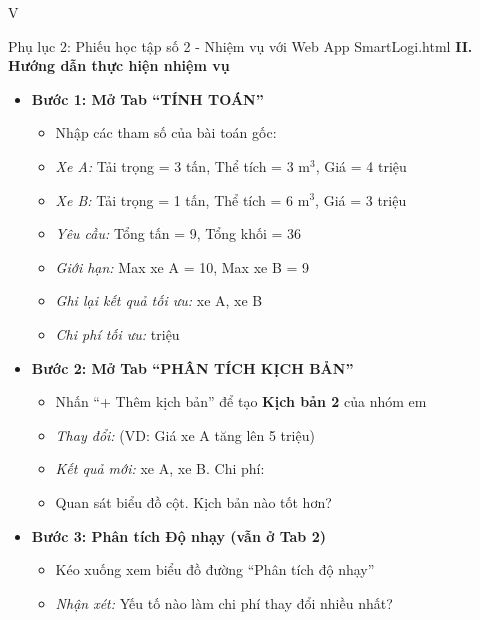 \documentclass[12pt,a4paper]{article}
\begin{document}
\begin{competitionsection}{V}
\begin{phieuhoc_tap_box}{Phụ lục 2: Phiếu học tập số 2 - Nhiệm vụ với Web App SmartLogi.html}
\textbf{\color{accent}II. Hướng dẫn thực hiện nhiệm vụ}
\begin{itemize}[leftmargin=*,noitemsep]
\item \textbf{Bước 1: Mở Tab ``TÍNH TOÁN''}
    \begin{itemize}
    \item Nhập các tham số của bài toán gốc:
    \item \textit{Xe A:} Tải trọng = 3 tấn, Thể tích = 3 m$^3$, Giá = 4 triệu
    \item \textit{Xe B:} Tải trọng = 1 tấn, Thể tích = 6 m$^3$, Giá = 3 triệu
    \item \textit{Yêu cầu:} Tổng tấn = 9, Tổng khối = 36
    \item \textit{Giới hạn:} Max xe A = 10, Max xe B = 9
    \item \textit{Ghi lại kết quả tối ưu:} \underline{\hspace{2cm}} xe A, \underline{\hspace{2cm}} xe B
    \item \textit{Chi phí tối ưu:} \underline{\hspace{4cm}} triệu
    \end{itemize}
\item \textbf{Bước 2: Mở Tab ``PHÂN TÍCH KỊCH BẢN''}
    \begin{itemize}
    \item Nhấn ``+ Thêm kịch bản'' để tạo \textbf{Kịch bản 2} của nhóm em
    \item \textit{Thay đổi:} (VD: Giá xe A tăng lên 5 triệu) \underline{\hspace{6cm}}
    \item \textit{Kết quả mới:} \underline{\hspace{2cm}} xe A, \underline{\hspace{2cm}} xe B. Chi phí: \underline{\hspace{3cm}}
    \item Quan sát biểu đồ cột. Kịch bản nào tốt hơn? \underline{\hspace{4cm}}
    \end{itemize}
\item \textbf{Bước 3: Phân tích Độ nhạy (vẫn ở Tab 2)}
    \begin{itemize}
    \item Kéo xuống xem biểu đồ đường ``Phân tích độ nhạy''
    \item \textit{Nhận xét:} Yếu tố nào làm chi phí thay đổi nhiều nhất? \underline{\hspace{8cm}}
    \end{itemize}

\end{itemize}
\end{phieuhoc_tap_box}
\end{competitionsection}
\end{document}
